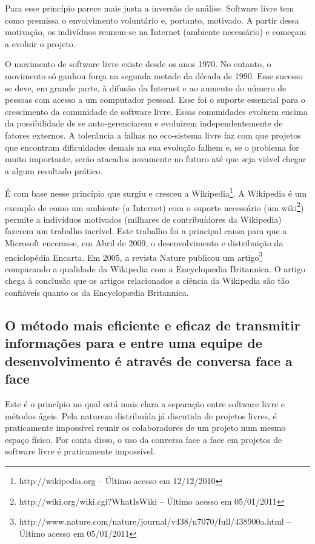 Para esse princípio parece mais justa a inversão de análise. Software
livre tem como premissa o envolvimento voluntário e, portanto,
motivado. A partir dessa motivação, os indivíduos reunem-se na
Internet (ambiente necessário) e começam a evoluir o projeto.

O movimento de software livre existe desde os anos 1970. No entanto, o
movimento só ganhou força na segunda metade da década de 1990. Esse
sucesso se deve, em grande parte, à difusão da Internet e ao aumento
do número de pessoas com acesso a um computador pessoal. Esse foi o
suporte essencial para o crescimento da comunidade de software
livre. Essas comunidades evoluem encima da possibilidade de se
auto-gerenciarem e evoluirem independentemente de fatores externos. A
tolerância a falhas no eco-sistema livre faz com que projetos que
encontram dificuldades demais na sua evolução falhem e, se o problema
for muito importante, serão atacados novamente no futuro até que seja
viável chegar a algum resultado prático.

É com base nesse princípio que surgiu e cresceu a
Wikipedia\footnote{http://wikipedia.org -- Último acesso em
  12/12/2010}. A Wikipedia é um exemplo de como um ambiente (a
Internet) com o suporte necessário (um
wiki\footnote{http://wiki.org/wiki.cgi?WhatIsWiki -- Último acesso em
  05/01/2011}) permite a indivíduos motivados (milhares de
contribuídores da Wikipedia) fazerem um trabalho incrível. Este
trabalho foi a principal causa para que a Microsoft encerasse, em
Abril de 2009, o desenvolvimento e distribuição da enciclopédia
Encarta. Em 2005, a revista Nature publicou um
artigo\footnote{http://www.nature.com/nature/journal/v438/n7070/full/438900a.html
  -- Último acesso em 05/01/2011} comparando a qualidade da Wikipedia
com a Encyclop{\ae}dia Britannica. O artigo chega à conclusão que os
artigos relacionados a ciência da Wikipedia são tão confiáveis quanto
os da Encyclop{\ae}dia Britannica.

\subsection[Conversa face a face]{O método mais eficiente e eficaz de
  transmitir informações para e entre uma equipe de desenvolvimento é
  através de conversa face a face}

Este é o princípio no qual está mais clara a separação entre software
livre e métodos ágeis. Pela natureza distribuída já discutida de
projetos livres, é praticamente impossível reunir os colaboradores de
um projeto num mesmo espaço físico. Por conta disso, o uso da conversa
face a face em projetos de software livre é praticamente impossível.

